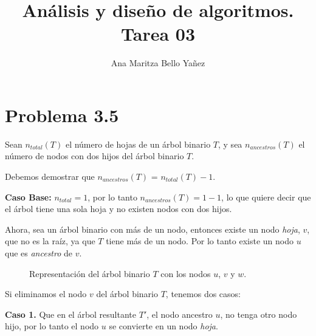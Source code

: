 \documentclass{article}
\begin{document}
\title{Análisis y diseño de algoritmos. \\ Tarea 03}
\author{Ana Maritza Bello Yañez}
\maketitle

\section*{Problema 3.5}


Sean $n_{total}(T)$ el número de hojas de un árbol binario $T$, y sea
$n_{ancestros}(T)$ el número de nodos con dos hijos del árbol binario $T$.

Debemos demostrar que $n_{ancestros}(T)$ = $n_{total}(T) - 1$.

\textbf{Caso Base:} $n_{total} = 1$, por lo tanto $n_{ancestros}(T)= 1 - 1$, lo
que quiere decir que el árbol tiene una sola hoja y no existen nodos con dos
hijos.

Ahora, sea un árbol binario con más de un nodo, entonces existe un nodo
\textit{hoja}, $v$, que no es la raíz, ya que $T$ tiene más de un nodo.
Por lo tanto existe un nodo $u$ que es \textit{ancestro} de $v$.

\begin{figure}[h!]
    \begin{center}		
    \end{center}
    \caption{Representación del árbol binario $T$ con los nodos $u$, $v$ y $w$.}
\end{figure}

Si eliminamos el nodo $v$ del árbol binario $T$, tenemos dos casos:

\textbf{Caso 1.} Que en el árbol resultante $T'$, el nodo ancestro $u$, no tenga
otro nodo hijo, por lo tanto el nodo $u$ se convierte en un nodo \textit{hoja}. 
\end{document}
